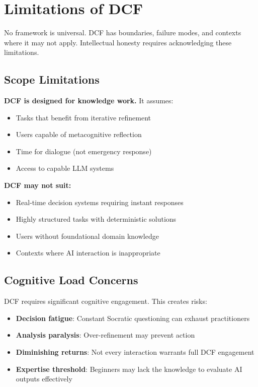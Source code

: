 \chapter{Limitations of DCF}

No framework is universal. DCF has boundaries, failure modes, and contexts where it may not apply. Intellectual honesty requires acknowledging these limitations.

\section{Scope Limitations}

\textbf{DCF is designed for knowledge work.} It assumes:
\begin{itemize}
    \item Tasks that benefit from iterative refinement
    \item Users capable of metacognitive reflection
    \item Time for dialogue (not emergency response)
    \item Access to capable LLM systems
\end{itemize}

\textbf{DCF may not suit:}
\begin{itemize}
    \item Real-time decision systems requiring instant responses
    \item Highly structured tasks with deterministic solutions
    \item Users without foundational domain knowledge
    \item Contexts where AI interaction is inappropriate
\end{itemize}

\section{Cognitive Load Concerns}

DCF requires significant cognitive engagement. This creates risks:

\begin{itemize}
    \item \textbf{Decision fatigue}: Constant Socratic questioning can exhaust practitioners
    \item \textbf{Analysis paralysis}: Over-refinement may prevent action
    \item \textbf{Diminishing returns}: Not every interaction warrants full DCF engagement
    \item \textbf{Expertise threshold}: Beginners may lack the knowledge to evaluate AI outputs effectively
\end{itemize}

